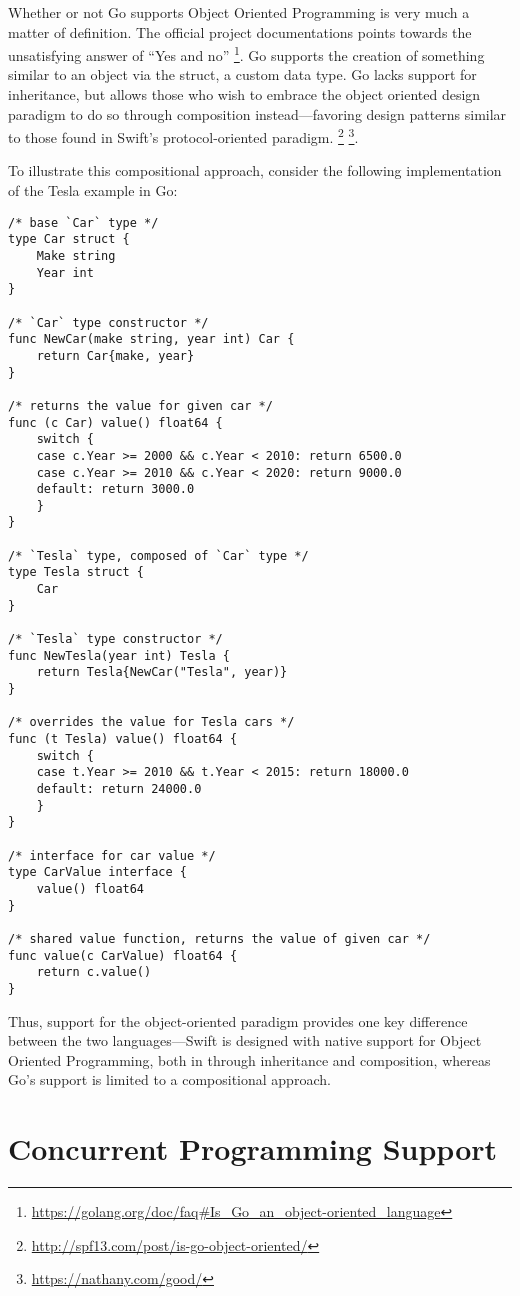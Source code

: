\documentclass[letterpaper]{article}
\begin{document}
Whether or not Go supports Object Oriented Programming is very much a matter of definition. The official project documentations points towards the unsatisfying answer of “Yes and no” \footnote{\url{https://golang.org/doc/faq#Is_Go_an_object-oriented_language}}. Go supports the creation of something similar to an object via the struct, a custom data type. Go lacks support for inheritance, but allows those who wish to embrace the object oriented design paradigm to do so through composition instead—favoring design patterns similar to those found in Swift's protocol-oriented paradigm. \footnote{\url{http://spf13.com/post/is-go-object-oriented/}} \footnote{\url{https://nathany.com/good/}}.

To illustrate this compositional approach, consider the following implementation of the Tesla example in Go:

\begin{verbatim}
/* base `Car` type */
type Car struct {
    Make string
    Year int
}

/* `Car` type constructor */
func NewCar(make string, year int) Car {
    return Car{make, year}
}

/* returns the value for given car */
func (c Car) value() float64 {
    switch {
    case c.Year >= 2000 && c.Year < 2010: return 6500.0
    case c.Year >= 2010 && c.Year < 2020: return 9000.0
    default: return 3000.0
    }
}

/* `Tesla` type, composed of `Car` type */
type Tesla struct {
    Car
}

/* `Tesla` type constructor */
func NewTesla(year int) Tesla {
    return Tesla{NewCar("Tesla", year)}
}

/* overrides the value for Tesla cars */
func (t Tesla) value() float64 {
    switch {
    case t.Year >= 2010 && t.Year < 2015: return 18000.0
    default: return 24000.0
    }
}

/* interface for car value */
type CarValue interface {
    value() float64
}

/* shared value function, returns the value of given car */
func value(c CarValue) float64 {
    return c.value()
}
\end{verbatim}

Thus, support for the object-oriented paradigm provides one key difference between the two languages—Swift is designed with native support for Object Oriented Programming, both in through inheritance and composition, whereas Go’s support is limited to a compositional approach.

\section{Concurrent Programming Support}
\end{document}
